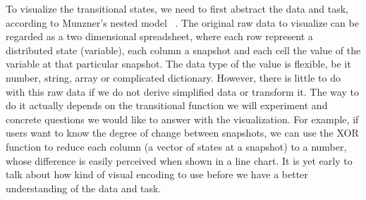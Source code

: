 To visualize the transitional states, we need to first abstract the 
data and task, according to Munzner's nested model ~\cite{munzner2009nested}.
The original raw data to visualize can be regarded as a two dimensional 
spreadsheet, where each row represent a distributed state (variable),
 each column a snapshot and each cell the value of the variable at
 that particular snapshot.  The data type of the value is flexible,
 be it number, string, array or complicated dictionary.
However, there is little to do with this raw data if we do not derive
simplified data or transform it.  The way to do it actually depends on 
the transitional function we will experiment and concrete questions we
would like to answer with the visualization.  For example, if users want
to know the degree of change between snapshots, we can use the XOR function
to reduce each column (a vector of states at a snapshot) to a number,
whose difference is easily perceived when shown in a line chart.
It is yet early to talk about how kind of visual encoding to use before
we have a better understanding of the data and task.